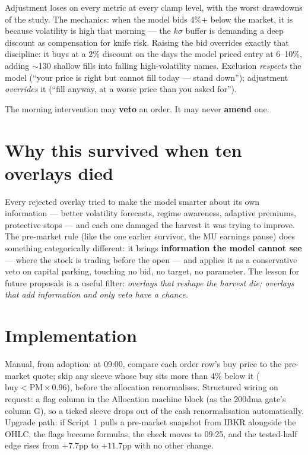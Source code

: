 \documentclass[11pt,a4paper]{article}
\begin{document}
Adjustment loses on every metric at every clamp level, with the worst
drawdowns of the study. The mechanics: when the model bids 4\%+ below the
market, it is because volatility is high that morning --- the $k\sigma$ buffer
is demanding a deep discount as compensation for knife risk. Raising the bid
overrides exactly that discipline: it buys at a 2\% discount on the days the
model priced entry at 6--10\%, adding $\sim$130 shallow fills into falling
high-volatility names. Exclusion \emph{respects} the model (``your price is
right but cannot fill today --- stand down''); adjustment \emph{overrides} it
(``fill anyway, at a worse price than you asked for'').

\begin{tcolorbox}[colback=bcgold!8, colframe=bcgold, boxrule=0.8pt,
  title={\bfseries The standing discipline}, coltitle=bcnavy]
The morning intervention may \textbf{veto} an order. It may never
\textbf{amend} one.
\end{tcolorbox}

\section{Why this survived when ten overlays died}

Every rejected overlay tried to make the model smarter about its own
information --- better volatility forecasts, regime awareness, adaptive
premiums, protective stops --- and each one damaged the harvest it was trying
to improve. The pre-market rule (like the one earlier survivor, the MU
earnings pause) does something categorically different: it brings
\textbf{information the model cannot see} --- where the stock is trading
before the open --- and applies it as a conservative veto on capital parking,
touching no bid, no target, no parameter. The lesson for future proposals is a
useful filter: \emph{overlays that reshape the harvest die; overlays that add
information and only veto have a chance.}

\section{Implementation}

Manual, from adoption: at 09:00, compare each order row's buy price to the
pre-market quote; skip any sleeve whose buy sits more than 4\% below it
($\text{buy} < \text{PM} \times 0.96$), before the allocation renormalises.
Structured wiring on request: a flag column in the Allocation machine block
(as the 200dma gate's column G), so a ticked sleeve drops out of the cash
renormalisation automatically. Upgrade path: if Script~1 pulls a pre-market
snapshot from IBKR alongside the OHLC, the flags become formulas, the check
moves to 09:25, and the tested-half edge rises from $+7.7$pp to $+11.7$pp with
no other change.
\end{document}

